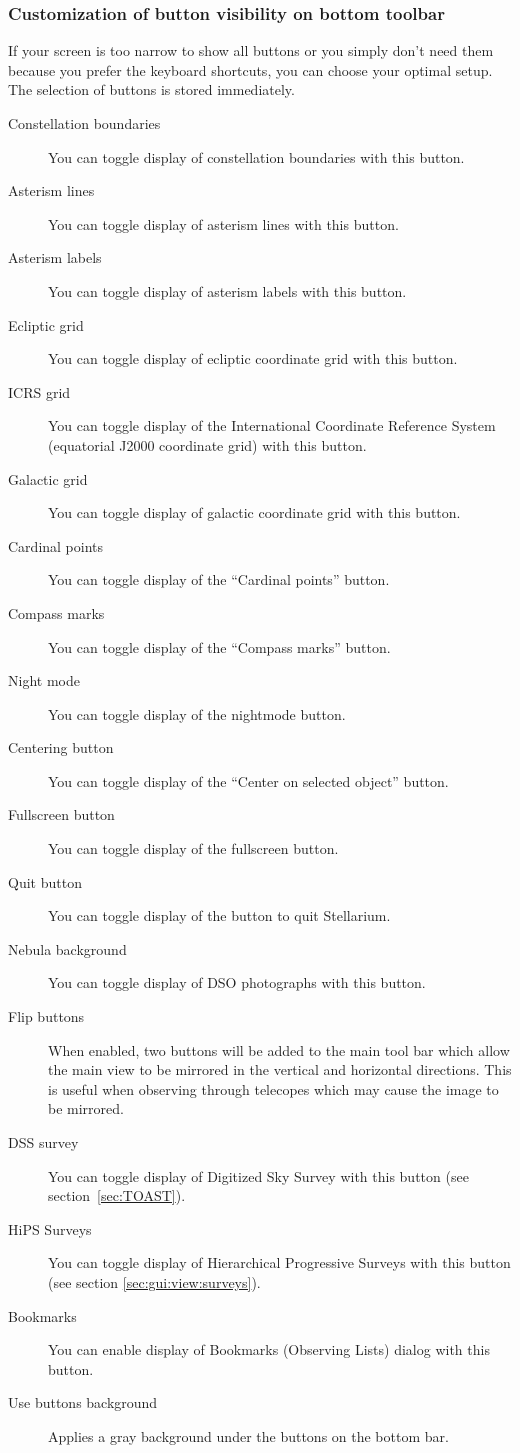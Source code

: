 \subsubsection{Customization of button visibility on bottom toolbar}
\label{sec:gui:configuration:extras:buttons}
If your screen is too narrow to show all buttons
or you simply don't need them because you prefer the keyboard shortcuts,
you can choose your optimal setup. The selection of buttons is stored immediately. 
\begin{description}
\item[Constellation boundaries] You can toggle display of constellation boundaries with this button.
\item[Asterism lines] You can toggle display of asterism lines with this button.
\item[Asterism labels] You can toggle display of asterism labels with this button.
\item[Ecliptic grid] You can toggle display of ecliptic coordinate grid with this button.
\item[ICRS grid] You can toggle display of the International Coordinate Reference System (equatorial J2000 coordinate grid) with this button.
\item[Galactic grid] You can toggle display of galactic coordinate grid with this button.
\item[Cardinal points] You can toggle display of the ``Cardinal points'' button.
\item[Compass marks] You can toggle display of the ``Compass marks'' button.
\item[Night mode] You can toggle display of the nightmode button.
\item[Centering button] You can toggle display of the ``Center on selected object'' button.
\item[Fullscreen button] You can toggle display of the fullscreen button.
\item[Quit button] You can toggle display of the button to quit Stellarium.
\item[Nebula background] You can toggle display of DSO photographs with this button.
\item[Flip buttons] When enabled, two buttons will be added to
  the main tool bar which allow the main view to be mirrored in the
  vertical and horizontal directions. This is useful when observing
  through telecopes which may cause the image to be mirrored.
\item[DSS survey] You can toggle display of Digitized Sky Survey with this button (see section~\ref{sec:TOAST}).
\item[HiPS Surveys] You can toggle display of Hierarchical Progressive Surveys with this button (see section \ref{sec:gui:view:surveys}).
\item[Bookmarks] You can enable display of Bookmarks (Observing Lists) dialog with this button.
\item[Use buttons background] Applies a gray background under the buttons on the bottom bar.
\end{description}

